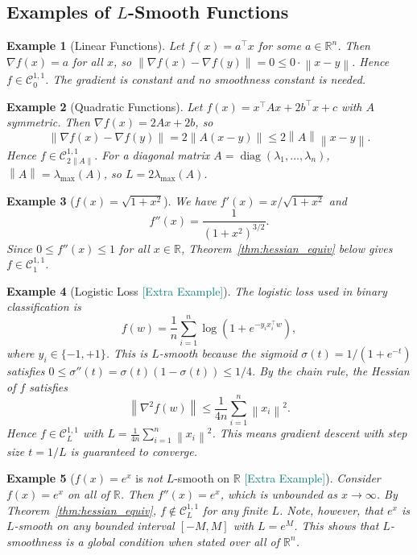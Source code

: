 \documentclass[11pt]{article}
\theoremstyle{definition}
\theoremstyle{plain}
\newtheorem{example}{Example}
\newcommand{\R}{\mathbb{R}}
\newcommand{\norm}[1]{\left\|#1\right\|}
\newcommand{\grad}{\nabla}
\begin{document}
\subsection{Examples of $L$-Smooth Functions}

\begin{example}[Linear Functions]\label{ex:linear_smooth}
Let $f(x)=a^\top x$ for some $a\in\R^n$.
Then $\grad f(x)=a$ for all $x$, so
$\norm{\grad f(x)-\grad f(y)}=0\leq 0\cdot\norm{x-y}$.
Hence $f\in\mathcal{C}^{1,1}_0$. The gradient is constant and no smoothness constant is needed.
\end{example}

\begin{example}[Quadratic Functions]\label{ex:quad_smooth}
Let $f(x)=x^\top Ax+2b^\top x+c$ with $A$ symmetric. Then $\grad f(x)=2Ax+2b$, so
\[
  \norm{\grad f(x)-\grad f(y)} = 2\norm{A(x-y)} \leq 2\norm{A}\norm{x-y}.
\]
Hence $f\in\mathcal{C}^{1,1}_{2\|A\|}$. For a diagonal matrix
$A=\operatorname{diag}(\lambda_1,\ldots,\lambda_n)$, $\norm{A}=\lambda_{\max}(A)$,
so $L=2\lambda_{\max}(A)$.
\end{example}

\begin{example}[$f(x)=\sqrt{1+x^2}$]\label{ex:sqrt_smooth}
We have $f'(x)=x/\sqrt{1+x^2}$ and
\[
  f''(x) = \frac{1}{(1+x^2)^{3/2}}.
\]
Since $0\leq f''(x)\leq 1$ for all $x\in\R$, Theorem~\ref{thm:hessian_equiv} below
gives $f\in\mathcal{C}^{1,1}_1$.
\end{example}

\begin{example}[Logistic Loss \textmd{\textcolor{teal}{[Extra Example]}}]\label{ex:logistic_smooth}
The logistic loss used in binary classification is
\[
  f(w) = \frac{1}{n}\sum_{i=1}^n \log\!\left(1+e^{-y_i x_i^\top w}\right),
\]
where $y_i\in\{-1,+1\}$. This is $L$-smooth because the sigmoid
$\sigma(t)=1/(1+e^{-t})$ satisfies $0\leq\sigma''(t)=\sigma(t)(1-\sigma(t))\leq 1/4$.
By the chain rule, the Hessian of $f$ satisfies
\[
  \norm{\grad^2 f(w)} \leq \frac{1}{4n}\sum_{i=1}^n\norm{x_i}^2.
\]
Hence $f\in\mathcal{C}^{1,1}_L$ with $L=\frac{1}{4n}\sum_{i=1}^n\norm{x_i}^2$.
This means gradient descent with step size $t=1/L$ is guaranteed to converge.
\end{example}

\begin{example}[$f(x)=e^{x}$ is \emph{not} $L$-smooth on $\R$ \textmd{\textcolor{teal}{[Extra Example]}}]\label{ex:exp_not_smooth}
Consider $f(x)=e^x$ on all of $\R$. Then $f''(x)=e^x$, which is unbounded
as $x\to\infty$. By Theorem~\ref{thm:hessian_equiv}, $f\notin\mathcal{C}^{1,1}_L$ for any finite $L$.
Note, however, that $e^x$ \emph{is} $L$-smooth on any bounded interval $[-M,M]$
with $L=e^M$. This shows that $L$-smoothness is a \emph{global} condition
when stated over all of $\R^n$.
\end{example}
\end{document}
